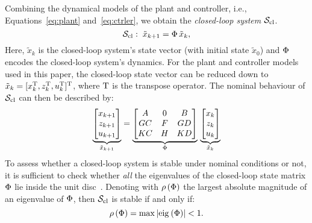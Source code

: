 Combining the dynamical models of the plant and controller, i.e., Equations~\eqref{eq:plant} and~\eqref{eq:ctrler}, we obtain the \emph{closed-loop system} $\mathcal{S}_{\text{cl}}$.
%
\begin{equation}
    \label{eq:clsys}
    \clsys :\; \tilde x_{k+1} = \clmat \,\tilde x_{k},
\end{equation}
%
Here, $\tilde x_{k}$ is the closed-loop system's state vector (with initial state $\tilde{x}_0$) and $\Phi$ encodes the closed-loop system's dynamics.
For the plant and controller models used in this paper, the closed-loop state vector can be reduced down to $\tilde x_{k} = [ x^{\mathrm{\small{T}}}_k, z^{\mathrm{\small{T}}}_k, u^{\mathrm{\small{T}}}_k ]^{\mathrm{\small{T}}}$, where $\mathrm{\small{T}}$ is the transpose operator.
The nominal behaviour of $\mathcal{S}_{\text{cl}}$ can then be described by:
%
\begin{equation}
    \label{eq:nom}
    \underbrace{\begin{bmatrix}
        x_{k+1} \\
        z_{k+1} \\
        u_{k+1}
    \end{bmatrix}}_{\tilde x_{k+1}} = \underbrace{\begin{bmatrix}
        \Ap & 0 & \Bp \\
        \Bc\Cp & \Ac & \Bc\Dp \\
        \Dc\Cp & \Cc & \Dc\Dp
    \end{bmatrix}}_{\clmat} \, \underbrace{\begin{bmatrix}
        x_k \\
        z_k \\
        u_k
    \end{bmatrix}}_{\tilde x_k}
\end{equation}
%
To assess whether a closed-loop system is stable under nominal conditions or not, it is sufficient to check whether \emph{all} the eigenvalues of the closed-loop state matrix $\Phi$ lie inside the unit disc~\cite{Astrom:1997}.
Denoting with $\rho\left( \Phi \right)$ the largest absolute magnitude of an eigenvalue of $\Phi$, then $\mathcal{S}_{\text{cl}}$ is stable if and only if:
%
\begin{equation}
    \label{eq:schur} 
    \rho\funof{\clmat} = \max{\abs{\eig{}{\clmat}}} < 1.
\end{equation}

